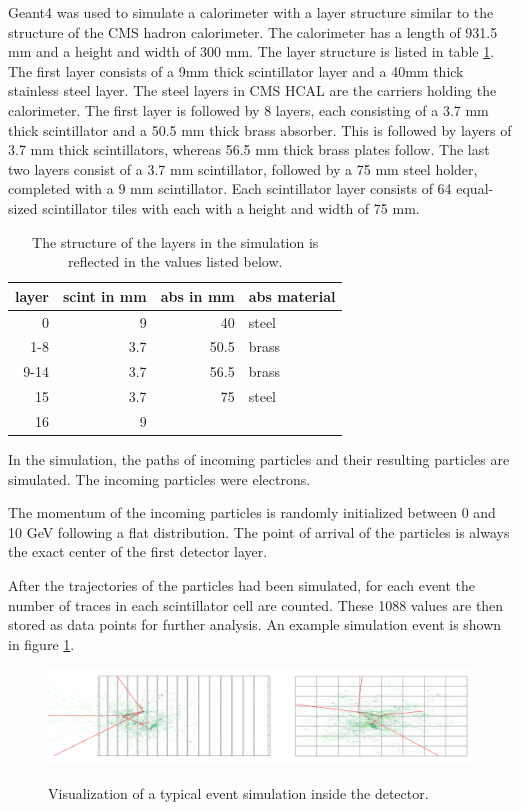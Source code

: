 \documentclass[12pt, a4paper]{thesis}
\begin{document}
Geant4 \cite{geant_simul_toolk} was used to simulate a calorimeter
with a layer structure similar to the structure of the CMS hadron
calorimeter. The calorimeter has a length of 931.5 mm and a height and
width of 300 mm. The layer structure is listed in table
\ref{fcn_structure}. The first layer consists of a 9mm thick
scintillator layer and a 40mm thick stainless steel layer. The steel
layers in CMS HCAL are the carriers holding the calorimeter. The first
layer is followed by 8 layers, each consisting of a 3.7 mm thick
scintillator and a 50.5 mm thick brass absorber. This is followed by
layers of 3.7 mm thick scintillators, whereas 56.5 mm thick brass
plates follow.  The last two layers consist of a 3.7 mm scintillator,
followed by a 75 mm steel holder, completed with a 9 mm
scintillator. Each scintillator layer consists of 64 equal-sized
scintillator tiles with each with a height and width of 75 mm.

\begin{table}[htbp]
  \label{fcn_structure}
\caption{
The structure of the layers in the simulation is reflected in the values listed below.}
\centering
\begin{tabular}{rrrl}
layer & scint in mm & abs in mm & abs material\\
\hline
0 & 9 & 40 & steel\\
1-8 & 3.7 & 50.5 & brass\\
9-14 & 3.7 & 56.5 & brass\\
15 & 3.7 & 75 & steel\\
16 & 9 &  & \\
\end{tabular}
\end{table}

In the simulation, the paths of incoming particles and their resulting particles
are simulated. The incoming particles were electrons.

The momentum of the incoming particles is randomly initialized between 0 and 10
GeV following a flat distribution. The point of arrival of the particles is
always the exact center of the first detector layer.

After the trajectories of the particles had been simulated, for each
event the number of traces in each scintillator cell are counted.
These 1088 values are then stored as data points for further
analysis. An example simulation event is shown in figure \ref{sim_exp}.

\begin{figure}[htbp]
\centering
\includegraphics[width=0.9 \textwidth]{../images/front-side.pdf}
\label{sim_exp}
\caption{
Visualization of a typical  event simulation inside the detector.}
\end{figure}
\end{document}
